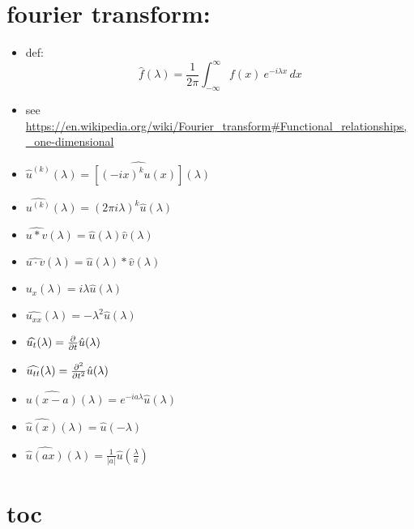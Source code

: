 \documentclass[11pt]{article}
\begin{document}
\section*{fourier transform:}
\label{sec:org9ca0d4c}
\begin{itemize}
\item def: \[\hat{f}(\lambda) = \frac{1}{2\pi} \int_{-\infty}^{\infty} f(x)\ e^{- i \lambda x}\,dx\]
\item see \url{https://en.wikipedia.org/wiki/Fourier\_transform\#Functional\_relationships,\_one-dimensional}
\item \(\hat{u}^{(k)}(\lambda) = \widehat{[(-ix)^k u(x) ]} (\lambda)\)
\item \(\widehat{u^{(k)}}(\lambda) = (2\pi{}i \lambda)^k \hat{u}(\lambda)\)
\item \(\widehat{u*v}(\lambda) = \hat{u}(\lambda)\hat{v}(\lambda)\)
\item \(\widehat{u\cdot v}(\lambda) = \hat{u}(\lambda)*\hat{v}(\lambda)\)
\item \(\widehat{u_x}(\lambda) = i \lambda \hat{u}(\lambda)\)
\item \(\widehat{u_{xx}}(\lambda) = - \lambda^2 \hat{u}(\lambda)\)
\item \(\widehat{u_t}(\lambda) = \frac{\partial }{\partial t} \hat{u}(\lambda)\)
\item \(\widehat{u_{tt}}(\lambda) = \frac{\partial ^2}{\partial t^2} \hat{u}(\lambda)\)
\item \(\widehat{u(x-a)}(\lambda) = e^{-ia \lambda} \hat{u} (\lambda)\)
\item \(\widehat{\hat{u}(x)}(\lambda) = \hat{u} (-\lambda)\)
\item \(\widehat{\hat{u}(ax)}(\lambda) = \frac{1}{|a|} \hat{u}\left (\frac{\lambda}{a}\right)\)
\end{itemize}

\section*{toc}
\label{sec:org5724051}
\end{document}
